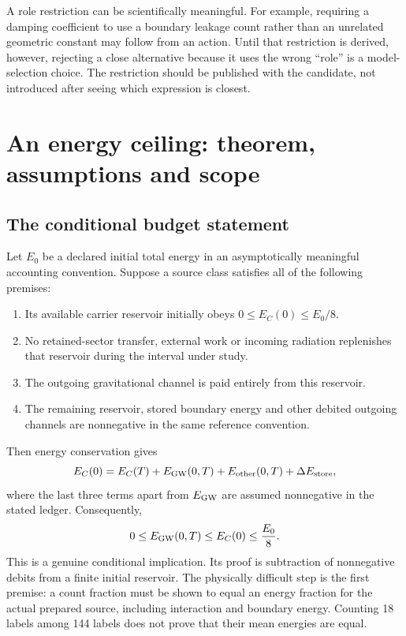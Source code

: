 A role restriction can be scientifically meaningful. For example, requiring a damping coefficient to use a boundary leakage count rather than an unrelated geometric constant may follow from an action. Until that restriction is derived, however, rejecting a close alternative because it uses the wrong ``role'' is a model-selection choice. The restriction should be published with the candidate, not introduced after seeing which expression is closest.

\section{An energy ceiling: theorem, assumptions and scope}
\subsection{The conditional budget statement}
Let $E_0$ be a declared initial total energy in an asymptotically meaningful accounting convention. Suppose a source class satisfies all of the following premises:
\begin{enumerate}
\item Its available carrier reservoir initially obeys $0\leq E_C(0)\leq E_0/8$.
\item No retained-sector transfer, external work or incoming radiation replenishes that reservoir during the interval under study.
\item The outgoing gravitational channel is paid entirely from this reservoir.
\item The remaining reservoir, stored boundary energy and other debited outgoing channels are nonnegative in the same reference convention.
\end{enumerate}
Then energy conservation gives
\begin{equation}
 E_C(0)=E_C(T)+E_{\rm GW}(0,T)+E_{\rm other}(0,T)
             +\Delta E_{\rm store},
 \label{c11:budget}
\end{equation}
where the last three terms apart from $E_{\rm GW}$ are assumed nonnegative in the stated ledger. Consequently,
\begin{equation}
 0\leq E_{\rm GW}(0,T)\leq E_C(0)\leq \frac{E_0}{8}.
 \label{c11:ceiling}
\end{equation}
This is a genuine conditional implication. Its proof is subtraction of nonnegative debits from a finite initial reservoir. The physically difficult step is the first premise: a count fraction must be shown to equal an energy fraction for the actual prepared source, including interaction and boundary energy. Counting 18 labels among 144 labels does not prove that their mean energies are equal.

